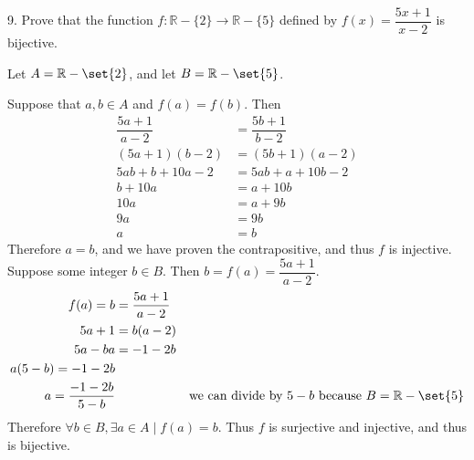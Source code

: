 \documentclass{hippoidC}
\begin{document}
\begin{prooflist}{9. Prove that the function $f: \mathbb{R}-\{2\} \rightarrow
    \mathbb{R}-\{5\}$ defined by $f(x)=\dfrac{5 x+1}{x-2}$ is bijective.}
\inj{}
\item Let $A=\mathbb{R}-\set{2}$, and let $B=\mathbb{R}-\set{5}$.
\item Suppose that $a, b\in A$ and $f(a)=f(b)$. Then
    \begin{align*}
        \dfrac{5 a+1}{a-2}&=\dfrac{5 b+1}{b-2}\\
    (5 a+1)(b-2)&=(5 b+1)(a-2)\\
    5ab+b+10a-2&= 5ab+a+10b-2\\
    b+10a&= a+10b\\
    10a&= a+9b\\
    9a&= 9b\\
    a&=b
    \end{align*}
Therefore $a=b$, and we have proven the contrapositive, and thus $f$ is injective.
\surj{}
Suppose some integer $b\in B$. Then $b = f(a) = \dfrac{5a+1}{a-2}$.
    \begin{align*}
        f(a) = b &= \dfrac{5a+1}{a-2}\\
        5a+1 &= b(a-2)\\
        5a-ba &= -1-2b\\
        a(5-b)=-1-2b\\
        a=\dfrac{-1-2b}{5-b}&&\text{we can divide by }5-b\text{ because }
        B=\mathbb{R}-\set{5}\\
    \end{align*}
Therefore $\forall b\in B, \exists a \in A \mid f(a)=b$.  Thus $f$ is surjective
and injective, and thus is bijective.
\end{prooflist}
\end{document}
